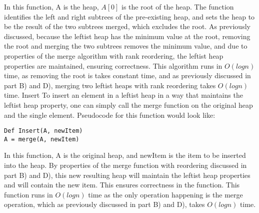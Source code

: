 \documentclass{article}
\begin{document}
In this function, A is the heap, $A[0]$ is the root of the heap.
The function identifies the left and right subtrees of the pre-existing heap, and sets the heap to be the result of the two subtrees merged, which excludes the root. As previously discussed, because the leftist heap has the minimum value at the root, removing the root and merging the two subtrees removes the minimum value, and due to properties of the merge algorithm with rank reordering, the leftist heap properties are maintained, ensuring correctness.
This algorithm runs in $O(logn)$ time, as removing the root is takes constant time, and as previously discussed in part B) and D), merging two leftist heaps with rank reordering takes $O(logn)$ time.
Insert
To insert an element in a leftist heap in a way that maintains the leftist heap property, one can simply call the merge function on the original heap and the single element. Pseudocode for this function would look like:
\begin{lstlisting}
Def Insert(A, newItem)
A = merge(A, newItem)
\end{lstlisting}
In this function, A is the original heap, and newItem is the item to be inserted into the heap.
By properties of the merge function with reordering discussed in part B) and D), this new resulting heap will maintain the leftist heap properties and will contain the new item. This ensures correctness in the function.
This function runs in $O(logn)$ time as the only operation happening is the merge operation, which as previously discussed in part B) and D), takes $O(logn)$ time.
\end{document}
